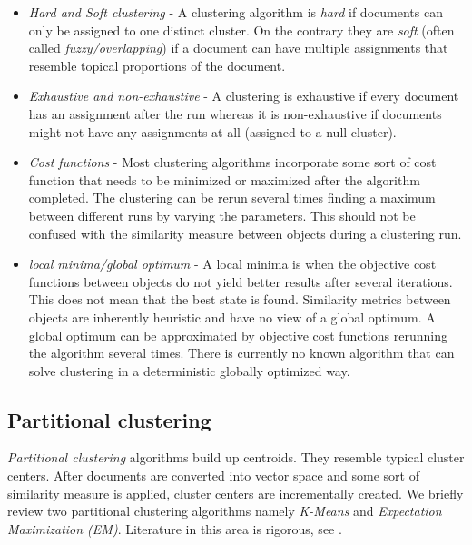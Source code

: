   \begin{itemize}
    \item \emph{Hard and Soft clustering} - A clustering algorithm is \emph{hard} if documents can only be assigned to one distinct cluster. On the contrary they are \emph{soft} (often called \emph{fuzzy/overlapping}) if a document can have multiple assignments that resemble topical proportions of the document.
    \item \emph{Exhaustive and non-exhaustive} - A clustering is exhaustive if every document has an assignment after the run whereas it is non-exhaustive if documents might not have any assignments at all (assigned to a null cluster).
    \item \emph{Cost functions} - Most clustering algorithms incorporate some sort of cost function that needs to be minimized or maximized after the algorithm completed. The clustering can be rerun several times finding a maximum between different runs by varying the parameters. This should not be confused with the similarity measure between objects during a clustering run.
    \item \emph{local minima/global optimum} - A local minima is when the objective cost functions between objects do not yield better results after several iterations. This does not mean that the best state is found. Similarity metrics between objects are inherently heuristic and have no view of a global optimum. A global optimum can be approximated by objective cost functions rerunning the algorithm several times. There is currently no known algorithm that can solve clustering in a deterministic globally optimized way.
  \end{itemize}

  \subsection{Partitional clustering}
    \emph{Partitional clustering} algorithms build up centroids. They resemble typical cluster centers. After documents are converted into vector space and some sort of similarity measure is applied, cluster centers are incrementally created. We briefly review two partitional clustering algorithms namely \emph{K-Means} and \emph{Expectation Maximization (EM)}. Literature in this area is rigorous, see \cite{ClusteringBooAggarwalk2013, NextFrontierClustering2013, IRBookStanford2008}.

